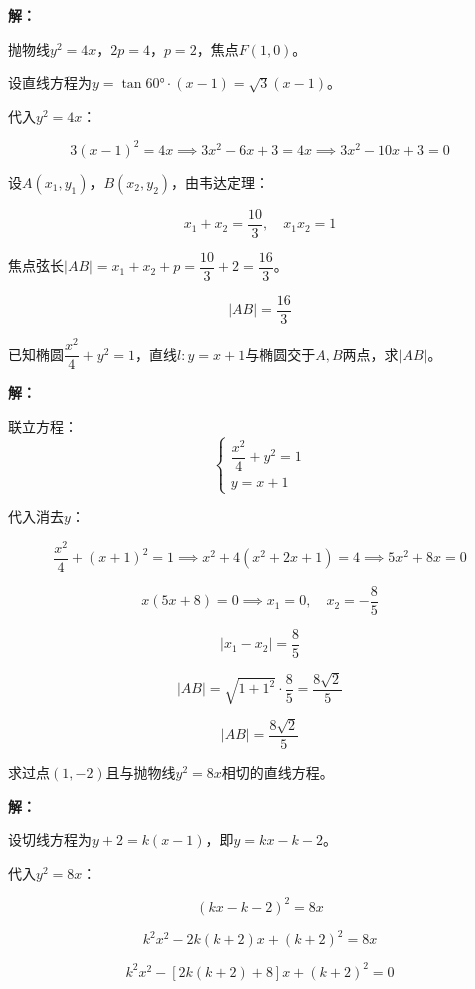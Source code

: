 \documentclass[12pt, a4paper]{ctexart}
\begin{document}
\textbf{解：}

抛物线$y^2 = 4x$，$2p = 4$，$p = 2$，焦点$F(1, 0)$。

设直线方程为$y = \tan 60° \cdot (x - 1) = \sqrt{3}(x - 1)$。

代入$y^2 = 4x$：

$$3(x - 1)^2 = 4x \implies 3x^2 - 6x + 3 = 4x \implies 3x^2 - 10x + 3 = 0$$

设$A(x_1, y_1)$，$B(x_2, y_2)$，由韦达定理：

$$x_1 + x_2 = \frac{10}{3}, \quad x_1 x_2 = 1$$

焦点弦长$|AB| = x_1 + x_2 + p = \dfrac{10}{3} + 2 = \dfrac{16}{3}$。

$$\boxed{|AB| = \dfrac{16}{3}}$$

\begin{examplebox}
已知椭圆$\dfrac{x^2}{4} + y^2 = 1$，直线$l: y = x + 1$与椭圆交于$A, B$两点，求$|AB|$。
\end{examplebox}

\textbf{解：}

联立方程：
$$\begin{cases} \dfrac{x^2}{4} + y^2 = 1 \\ y = x + 1 \end{cases}$$

代入消去$y$：

$$\frac{x^2}{4} + (x+1)^2 = 1 \implies x^2 + 4(x^2 + 2x + 1) = 4 \implies 5x^2 + 8x = 0$$

$$x(5x + 8) = 0 \implies x_1 = 0, \quad x_2 = -\frac{8}{5}$$

$$|x_1 - x_2| = \frac{8}{5}$$

$$|AB| = \sqrt{1 + 1^2} \cdot \frac{8}{5} = \frac{8\sqrt{2}}{5}$$

$$\boxed{|AB| = \dfrac{8\sqrt{2}}{5}}$$

\begin{examplebox}
求过点$(1, -2)$且与抛物线$y^2 = 8x$相切的直线方程。
\end{examplebox}

\textbf{解：}

设切线方程为$y + 2 = k(x - 1)$，即$y = kx - k - 2$。

代入$y^2 = 8x$：

$$(kx - k - 2)^2 = 8x$$

$$k^2 x^2 - 2k(k+2)x + (k+2)^2 = 8x$$

$$k^2 x^2 - [2k(k+2) + 8]x + (k+2)^2 = 0$$
\end{document}
